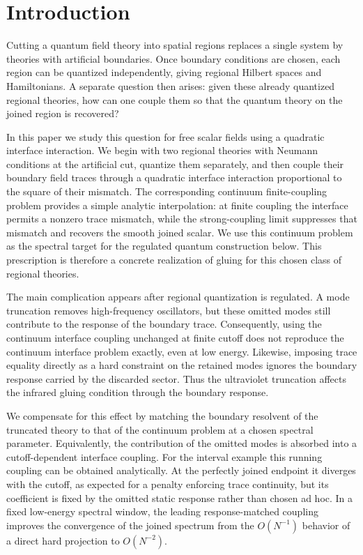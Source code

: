 \section{Introduction}\label{sec:introduction}

Cutting a quantum field theory into spatial regions replaces a single system by theories with artificial boundaries. Once boundary conditions are chosen, each region can be quantized independently, giving regional Hilbert spaces and Hamiltonians. A separate question then arises: given these already quantized regional theories, how can one couple them so that the quantum theory on the joined region is recovered?

In this paper we study this question for free scalar fields using a quadratic interface interaction. We begin with two regional theories with Neumann conditions at the artificial cut, quantize them separately, and then couple their boundary field traces through a quadratic interface interaction proportional to the square of their mismatch. The corresponding continuum finite-coupling problem provides a simple analytic interpolation: at finite coupling the interface permits a nonzero trace mismatch, while the strong-coupling limit suppresses that mismatch and recovers the smooth joined scalar. We use this continuum problem as the spectral target for the regulated quantum construction below. This prescription is therefore a concrete realization of gluing for this chosen class of regional theories.

The main complication appears after regional quantization is regulated. A mode truncation removes high-frequency oscillators, but these omitted modes still contribute to the response of the boundary trace. Consequently, using the continuum interface coupling unchanged at finite cutoff does not reproduce the continuum interface problem exactly, even at low energy. Likewise, imposing trace equality directly as a hard constraint on the retained modes ignores the boundary response carried by the discarded sector. Thus the ultraviolet truncation affects the infrared gluing condition through the boundary response.

We compensate for this effect by matching the boundary resolvent of the truncated theory to that of the continuum problem at a chosen spectral parameter. Equivalently, the contribution of the omitted modes is absorbed into a cutoff-dependent interface coupling. For the interval example this running coupling can be obtained analytically. At the perfectly joined endpoint it diverges with the cutoff, as expected for a penalty enforcing trace continuity, but its coefficient is fixed by the omitted static response rather than chosen ad hoc. In a fixed low-energy spectral window, the leading response-matched coupling improves the convergence of the joined spectrum from the \(O(N^{-1})\) behavior of a direct hard projection to \(O(N^{-2})\).

